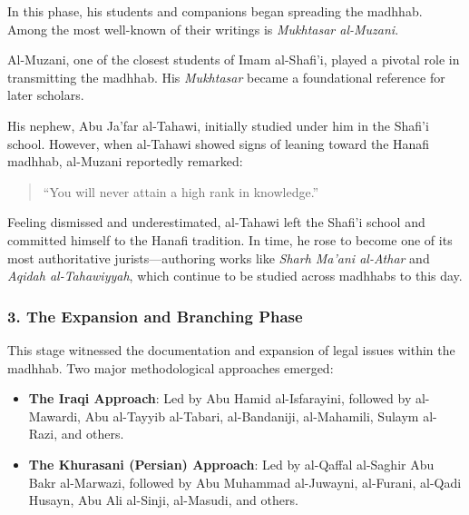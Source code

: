 \documentclass[
  a4paper,
  DIV=11,
  numbers=noendperiod]{scrartcl}
\begin{document}
In this phase, his students and companions began spreading the madhhab.
Among the most well-known of their writings is \emph{Mukhtasar
al-Muzani}.

\begin{tcolorbox}[enhanced jigsaw, colframe=quarto-callout-note-color-frame, breakable, toptitle=1mm, coltitle=black, opacityback=0, bottomrule=.15mm, left=2mm, bottomtitle=1mm, title=\textcolor{quarto-callout-note-color}{\faInfo}\hspace{0.5em}{The Legacy of al-Muzani and the Departure of al-Tahawi}, rightrule=.15mm, opacitybacktitle=0.6, colback=white, colbacktitle=quarto-callout-note-color!10!white, arc=.35mm, toprule=.15mm, titlerule=0mm, leftrule=.75mm]

Al-Muzani, one of the closest students of Imam al-Shafi'i, played a
pivotal role in transmitting the madhhab. His \emph{Mukhtasar} became a
foundational reference for later scholars.

His nephew, Abu Ja'far al-Tahawi, initially studied under him in the
Shafi'i school. However, when al-Tahawi showed signs of leaning toward
the Hanafi madhhab, al-Muzani reportedly remarked:

\begin{quote}
``You will never attain a high rank in knowledge.''
\end{quote}

Feeling dismissed and underestimated, al-Tahawi left the Shafi'i school
and committed himself to the Hanafi tradition. In time, he rose to
become one of its most authoritative jurists---authoring works like
\emph{Sharh Ma'ani al-Athar} and \emph{Aqidah al-Tahawiyyah}, which
continue to be studied across madhhabs to this day.

\end{tcolorbox}

\subsubsection{3. The Expansion and Branching
Phase}\label{the-expansion-and-branching-phase}

This stage witnessed the documentation and expansion of legal issues
within the madhhab. Two major methodological approaches emerged:

\begin{itemize}
\item
  \textbf{The Iraqi Approach}: Led by Abu Hamid al-Isfarayini, followed
  by al-Mawardi, Abu al-Tayyib al-Tabari, al-Bandaniji, al-Mahamili,
  Sulaym al-Razi, and others.
\item
  \textbf{The Khurasani (Persian) Approach}: Led by al-Qaffal al-Saghir
  Abu Bakr al-Marwazi, followed by Abu Muhammad al-Juwayni, al-Furani,
  al-Qadi Husayn, Abu Ali al-Sinji, al-Masudi, and others.
\end{itemize}
\end{document}
